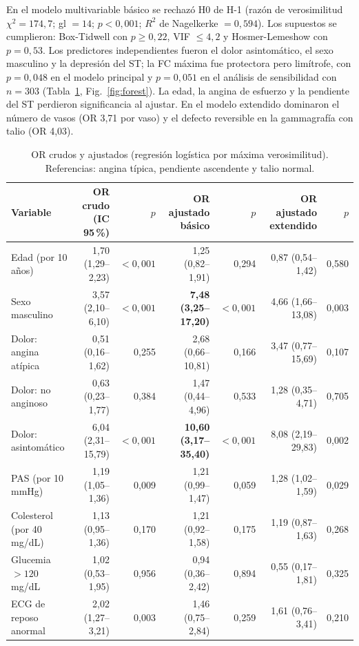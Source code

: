 \documentclass[twocolumn,10pt]{article}
\begin{document}
En el modelo multivariable b\'asico se rechaz\'o H0 de H-1 (raz\'on de verosimilitud $\chi^2=174{,}7$; gl $=14$; $p<0{,}001$; $R^2$ de Nagelkerke $=0{,}594$). Los supuestos se cumplieron: Box-Tidwell con $p\geq0{,}22$, VIF $\leq4{,}2$ y Hosmer-Lemeshow con $p=0{,}53$. Los predictores independientes fueron el dolor asintom\'atico, el sexo masculino y la depresi\'on del ST; la FC m\'axima fue protectora pero lim\'itrofe, con $p=0{,}048$ en el modelo principal y $p=0{,}051$ en el an\'alisis de sensibilidad con $n=303$ (Tabla~\ref{tab:or}, Fig.~\ref{fig:forest}). La edad, la angina de esfuerzo y la pendiente del ST perdieron significancia al ajustar. En el modelo extendido dominaron el n\'umero de vasos (OR 3,71 por vaso) y el defecto reversible en la gammagraf\'ia con talio (OR 4,03).

\begin{table}[t]
\centering
\caption{OR crudos y ajustados (regresi\'on log\'istica por m\'axima verosimilitud). Referencias: angina t\'ipica, pendiente ascendente y talio normal.}
\label{tab:or}
\small
\begin{tabular}{lrrrrrr}
\toprule
\textbf{Variable} & \textbf{OR crudo (IC 95\,\%)} & \textbf{$p$} & \textbf{OR ajustado b\'asico} & \textbf{$p$} & \textbf{OR ajustado extendido} & \textbf{$p$} \\
\midrule
Edad (por 10 a\~nos) & 1,70 (1,29--2,23) & $<0{,}001$ & 1,25 (0,82--1,91) & 0,294 & 0,87 (0,54--1,42) & 0,580 \\
Sexo masculino & 3,57 (2,10--6,10) & $<0{,}001$ & \textbf{7,48 (3,25--17,20)} & $<0{,}001$ & 4,66 (1,66--13,08) & 0,003 \\
Dolor: angina at\'ipica & 0,51 (0,16--1,62) & 0,255 & 2,68 (0,66--10,81) & 0,166 & 3,47 (0,77--15,69) & 0,107 \\
Dolor: no anginoso & 0,63 (0,23--1,77) & 0,384 & 1,47 (0,44--4,96) & 0,533 & 1,28 (0,35--4,71) & 0,705 \\
Dolor: asintom\'atico & 6,04 (2,31--15,79) & $<0{,}001$ & \textbf{10,60 (3,17--35,40)} & $<0{,}001$ & 8,08 (2,19--29,83) & 0,002 \\
PAS (por 10 mmHg) & 1,19 (1,05--1,36) & 0,009 & 1,21 (0,99--1,47) & 0,059 & 1,28 (1,02--1,59) & 0,029 \\
Colesterol (por 40 mg/dL) & 1,13 (0,95--1,36) & 0,170 & 1,21 (0,92--1,58) & 0,175 & 1,19 (0,87--1,63) & 0,268 \\
Glucemia $>120$ mg/dL & 1,02 (0,53--1,95) & 0,956 & 0,94 (0,36--2,42) & 0,894 & 0,55 (0,17--1,81) & 0,325 \\
ECG de reposo anormal & 2,02 (1,27--3,21) & 0,003 & 1,46 (0,75--2,84) & 0,259 & 1,61 (0,76--3,41) & 0,210 \\

\end{tabular}
\end{table}
\end{document}
